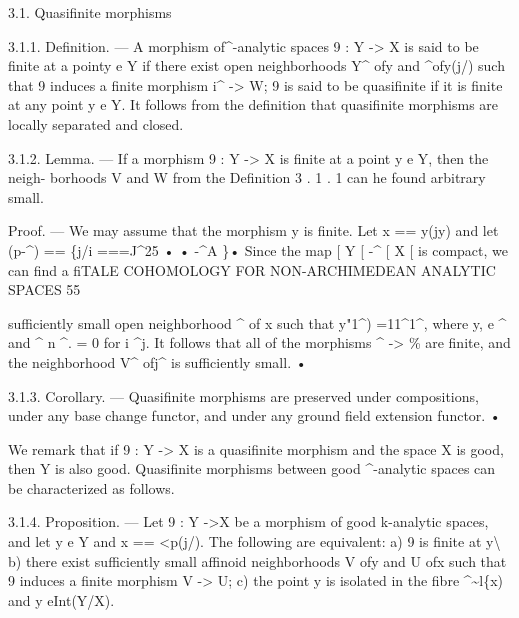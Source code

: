 \documentclass[
  10pt,
]{article}
\newenvironment{Shaded}{}{}
\newcommand{\NormalTok}[1]{#1}
\begin{document}
\begin{Shaded}
\begin{Highlighting}[]
\NormalTok{3.1. Quasifinite morphisms}

\NormalTok{       3.1.1. Definition. — A morphism of\^{}{-}analytic spaces 9 : Y {-}\textgreater{} X is said to be finite}
\NormalTok{at a pointy e Y if there exist open neighborhoods Y\^{} ofy and \^{}ofy(j/) such that 9 induces}
\NormalTok{a finite morphism i\^{} {-}\textgreater{} W; 9 is said to be quasifinite if it is finite at any point y e Y.}
\NormalTok{       It follows from the definition that quasifinite morphisms are locally separated}
\NormalTok{and closed.}

\NormalTok{          3.1.2. Lemma. — If a morphism 9 : Y {-}\textgreater{} X is finite at a point y e Y, then the neigh{-}}
\NormalTok{borhoods V and W from the Definition 3 . 1 . 1 can he found arbitrary small.}

\NormalTok{     Proof. — We may assume that the morphism y is finite. Let x == y(jy) and let}
\NormalTok{(p{-}\^{}) == \{j/i ===J\^{}25 • • {-}\^{}A \}• Since the map [ Y [ {-}\^{} [ X [ is compact, we can find a}
\NormalTok{            fiTALE COHOMOLOGY FOR NON{-}ARCHIMEDEAN ANALYTIC SPACES                                55}

\NormalTok{sufficiently small open neighborhood \^{} of x such that y"1\^{}) =11\^{}1\^{}, where}
\NormalTok{y, e \^{} and \^{} n \^{}. = 0 for i \^{}j. It follows that all of the morphisms \^{} {-}\textgreater{} \%}
\NormalTok{are finite, and the neighborhood V\^{} ofj\^{} is sufficiently small. •}

\NormalTok{      3.1.3. Corollary. — Quasifinite morphisms are preserved under compositions, under any}
\NormalTok{base change functor, and under any ground field extension functor. •}

\NormalTok{     We remark that if 9 : Y {-}\textgreater{} X is a quasifinite morphism and the space X is good,}
\NormalTok{then Y is also good. Quasifinite morphisms between good \^{}{-}analytic spaces can be}
\NormalTok{characterized as follows.}

\NormalTok{      3.1.4. Proposition. — Let 9 : Y {-}\textgreater{}X be a morphism of good k{-}analytic spaces, and let}
\NormalTok{y e Y and x == \textless{}p(j/). The following are equivalent:}
\NormalTok{      a) 9 is finite at y\textbackslash{}}
\NormalTok{       b) there exist sufficiently small affinoid neighborhoods V ofy and U ofx such that 9 induces}
\NormalTok{a finite morphism V {-}\textgreater{} U;}
\NormalTok{      c) the point y is isolated in the fibre \^{}\textquotesingle{}\textasciitilde{}l\{x) and y eInt(Y/X).}


\end{Highlighting}
\end{Shaded}
\end{document}

